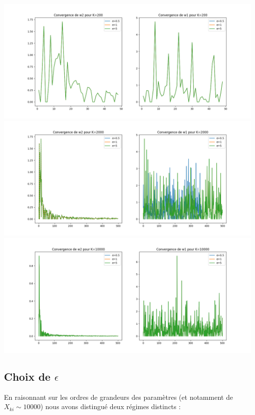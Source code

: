 \documentclass[a4paper,11pt]{article}
\begin{document}
\includegraphics[width=15cm]{"Fig1 Cv K=200"}\\
\includegraphics[width=15cm]{"Fig2 Cv K=2000"}\\
\includegraphics[width=15cm]{"Fig3 Cv K=10000"}\\
	
\subsection{Choix de $\epsilon$}
En raisonnant sur les ordres de grandeurs des paramètres (et notamment de $X_{ki} \sim 10000$) nous avons distingué deux régimes distincts :\\
	
\end{document}
